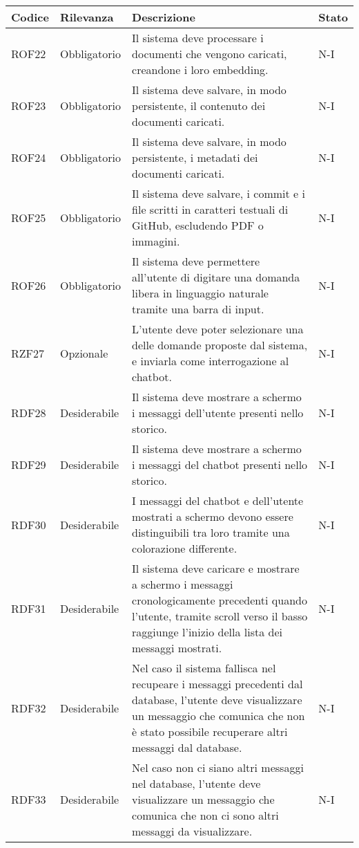 \vspace{0.5cm}
\newpage
\begin{table}[h!]
    \renewcommand{\arraystretch}{1.6} %
    \begin{tabularx}{\textwidth}{|p{2cm}|p{3cm}|X|p{4cm}|} \hline
    \rowcolor[HTML]{FFD700} 
    \textbf{Codice} & \textbf{Rilevanza} & \textbf{Descrizione} & \textbf{Stato} \\ \hline
    ROF22 & Obbligatorio & Il sistema deve processare i documenti che vengono caricati, creandone i loro embedding. & N-I\\ \hline
    ROF23 & Obbligatorio & Il sistema deve salvare, in modo persistente, il contenuto dei documenti caricati. & N-I\\ \hline
    ROF24 & Obbligatorio & Il sistema deve salvare, in modo persistente, i metadati dei documenti caricati. & N-I\\ \hline
    ROF25 & Obbligatorio & Il sistema deve salvare, i commit e i file scritti in caratteri testuali di GitHub, escludendo PDF o immagini. & N-I\\ \hline
    ROF26 & Obbligatorio & Il sistema deve permettere all'utente di digitare una domanda libera in linguaggio naturale tramite una barra di input. & N-I \\ \hline
    RZF27 & Opzionale & L'utente deve poter selezionare una delle domande proposte dal sistema, e inviarla come interrogazione al chatbot. & N-I \\ \hline
    RDF28 & Desiderabile & Il sistema deve mostrare a schermo i messaggi dell'utente presenti nello storico. & N-I \\ \hline
    RDF29 & Desiderabile & Il sistema deve mostrare a schermo i messaggi del chatbot presenti nello storico. & N-I \\ \hline
    RDF30 & Desiderabile & I messaggi del chatbot e dell'utente mostrati a schermo devono essere distinguibili tra loro tramite una colorazione differente. & N-I \\ \hline
    RDF31 & Desiderabile & Il sistema deve caricare e mostrare a schermo i messaggi cronologicamente precedenti quando l'utente,
    tramite scroll verso il basso raggiunge l'inizio della lista dei messaggi mostrati. & N-I \\ \hline
    RDF32 & Desiderabile & Nel caso il sistema fallisca nel recupeare i messaggi precedenti dal database, l'utente deve visualizzare un messaggio che comunica che non è stato possibile recuperare altri messaggi dal database. & N-I \\ \hline
    RDF33 & Desiderabile & Nel caso non ci siano altri messaggi nel database, l'utente deve visualizzare un messaggio che comunica che non ci sono altri messaggi da visualizzare. & N-I \\ \hline

    \end{tabularx}
\end{table}

